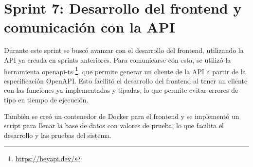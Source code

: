 


\section{Sprint 7: Desarrollo del frontend y comunicación con la API}
\label{anexo3:sec:sprint7}

Durante este sprint se buscó avanzar con el desarrollo del frontend, utilizando la API ya creada
en sprints anteriores. Para comunicarse con esta, se utilizó la herramienta openapi-ts%
\footnote{\url{https://heyapi.dev/}}, que permite generar un cliente de la API a partir de la
especificación OpenAPI. Esto facilitó el desarrollo del frontend al tener un cliente con las
funciones ya implementadas y tipadas, lo que permite evitar errores de tipo en tiempo de ejecución.

También se creó un contenedor de Docker para el frontend y se implementó un script para llenar
la base de datos con valores de prueba, lo que facilita el desarrollo y las pruebas del sistema.

